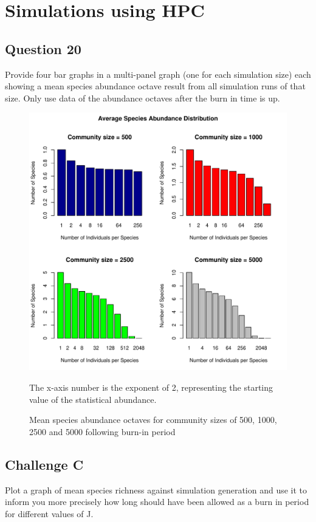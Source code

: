 \documentclass[12pt]{article}
\begin{document}
\newpage
\section{Simulations using HPC}
\subsection{Question 20}
Provide four bar graphs in a multi-panel graph (one for each simulation size) each showing a mean species abundance octave result from all simulation runs of that size. Only use data of the abundance octaves after the burn in time is up.

\begin{figure}[!ht]
\centering 
\includegraphics[width = 0.8\hsize]{../../results/Question20.pdf} 
\caption{Mean species abundance octaves for community sizes of 500, 1000, 2500 and 5000 following burn-in period}
The x-axis number is the exponent of 2, representing the starting value of the statistical abundance.
\end{figure}


\subsection{Challenge C}
Plot a graph of mean species richness against simulation generation and use it to inform you more precisely how long should have been allowed as a burn in period for different values of J.
\end{document}
